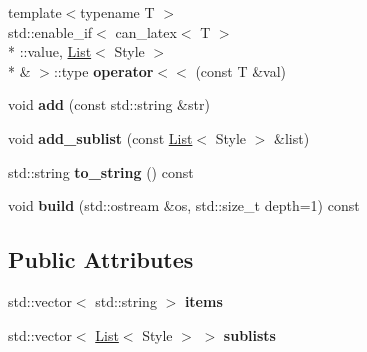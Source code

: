 \begin{DoxyCompactItemize}
\item 
\hypertarget{classlatex_1_1doc_1_1List_a68d596e7d17e04cfabbc06d80a954940}{{\footnotesize template$<$typename T $>$ }\\std\-::enable\-\_\-if$<$ can\-\_\-latex$<$ T $>$\\*
\-::value, \hyperlink{classlatex_1_1doc_1_1List}{List}$<$ Style $>$\\*
 \& $>$\-::type {\bfseries operator$<$$<$} (const T \&val)}\label{classlatex_1_1doc_1_1List_a68d596e7d17e04cfabbc06d80a954940}

\item 
\hypertarget{classlatex_1_1doc_1_1List_a04b52890de459bc6c6d0a6741b55bdf7}{void {\bfseries add} (const std\-::string \&str)}\label{classlatex_1_1doc_1_1List_a04b52890de459bc6c6d0a6741b55bdf7}

\item 
\hypertarget{classlatex_1_1doc_1_1List_a720d7827235c61d025ff66ed4723b0e9}{void {\bfseries add\-\_\-sublist} (const \hyperlink{classlatex_1_1doc_1_1List}{List}$<$ Style $>$ \&list)}\label{classlatex_1_1doc_1_1List_a720d7827235c61d025ff66ed4723b0e9}

\item 
\hypertarget{classlatex_1_1doc_1_1List_a5000125c08e3837c03f766f30a429cb1}{std\-::string {\bfseries to\-\_\-string} () const }\label{classlatex_1_1doc_1_1List_a5000125c08e3837c03f766f30a429cb1}

\item 
\hypertarget{classlatex_1_1doc_1_1List_a5ea2a813625fbeb5752ea66a12ac0a59}{void {\bfseries build} (std\-::ostream \&os, std\-::size\-\_\-t depth=1) const }\label{classlatex_1_1doc_1_1List_a5ea2a813625fbeb5752ea66a12ac0a59}

\end{DoxyCompactItemize}
\subsection*{Public Attributes}
\begin{DoxyCompactItemize}
\item 
\hypertarget{classlatex_1_1doc_1_1List_adacc628c072f9be831cab48615b8b564}{std\-::vector$<$ std\-::string $>$ {\bfseries items}}\label{classlatex_1_1doc_1_1List_adacc628c072f9be831cab48615b8b564}

\item 
\hypertarget{classlatex_1_1doc_1_1List_ac1ee0ddbd69ab8dfc46ae6f5fbdc21a1}{std\-::vector$<$ \hyperlink{classlatex_1_1doc_1_1List}{List}$<$ Style $>$ $>$ {\bfseries sublists}}\label{classlatex_1_1doc_1_1List_ac1ee0ddbd69ab8dfc46ae6f5fbdc21a1}

\end{DoxyCompactItemize}
